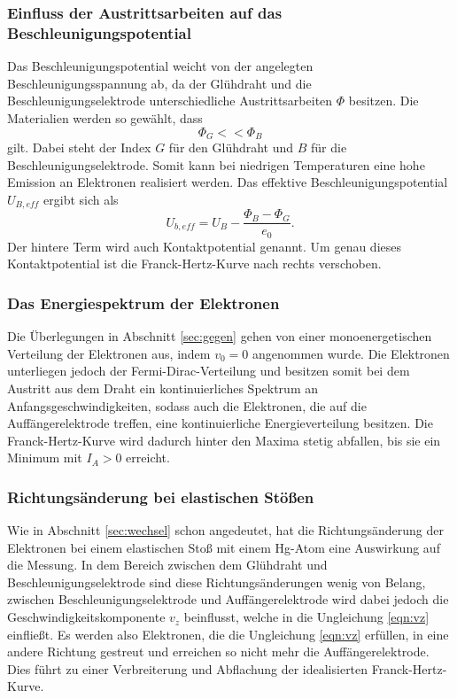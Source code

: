 \subsubsection*{Einfluss der Austrittsarbeiten auf das Beschleunigungspotential}
Das Beschleunigungspotential weicht von der angelegten Beschleunigungsspannung ab, da der Glühdraht und die Beschleunigungselektrode 
unterschiedliche Austrittsarbeiten $\Phi$ besitzen. Die Materialien werden so gewählt, dass 
\begin{equation*}
    \Phi_G<<\Phi_B    
\end{equation*}
gilt. Dabei steht der Index $G$ für den Glühdraht und $B$ für die Beschleunigungselektrode. Somit kann bei niedrigen 
Temperaturen eine hohe Emission an Elektronen realisiert werden. Das effektive Beschleunigungspotential $U_{B,eff}$ ergibt sich als 
\begin{equation*}
    U_{b,eff}=U_B-\frac{\Phi_B-\Phi_G}{e_0} .
\end{equation*}
Der hintere Term wird auch Kontaktpotential genannt. Um genau dieses Kontaktpotential ist die Franck-Hertz-Kurve nach rechts verschoben.

\subsubsection*{Das Energiespektrum der Elektronen}
Die Überlegungen in Abschnitt \ref{sec:gegen} gehen von einer monoenergetischen Verteilung der Elektronen aus, indem $v_0=0$ angenommen 
wurde. Die Elektronen unterliegen jedoch der Fermi-Dirac-Verteilung und besitzen somit bei dem Austritt aus dem Draht ein kontinuierliches
Spektrum an Anfangsgeschwindigkeiten, sodass auch die Elektronen, die auf die Auffängerelektrode treffen, eine kontinuierliche Energieverteilung
besitzen. Die Franck-Hertz-Kurve wird dadurch hinter den Maxima stetig abfallen, bis sie ein Minimum mit $I_A>0$ erreicht.

\subsubsection*{Richtungsänderung bei elastischen Stößen}
Wie in Abschnitt \ref{sec:wechsel} schon angedeutet, hat die Richtungsänderung der Elektronen bei einem elastischen Stoß mit einem Hg-Atom
eine Auswirkung auf die Messung. In dem Bereich zwischen dem Glühdraht und Beschleunigungselektrode sind diese Richtungsänderungen 
wenig von Belang, zwischen Beschleunigungselektrode und Auffängerelektrode wird dabei jedoch die Geschwindigkeitskomponente $v_z$ beinflusst,
welche in die Ungleichung \eqref{eqn:vz} einfließt. Es werden also Elektronen, die die Ungleichung \eqref{eqn:vz} erfüllen, in eine andere
Richtung gestreut und erreichen so nicht mehr die Auffängerelektrode. Dies führt zu einer Verbreiterung und Abflachung der idealisierten
Franck-Hertz-Kurve.

